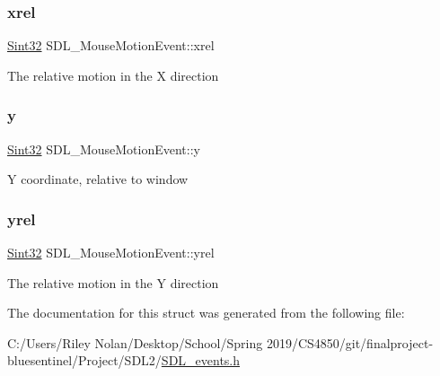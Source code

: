 \subsubsection{\texorpdfstring{xrel}{xrel}}
{\footnotesize\ttfamily \mbox{\hyperlink{_s_d_l__stdinc_8h_a7a90b941db9d4582e9ad7abb9940ff7e}{Sint32}} S\+D\+L\+\_\+\+Mouse\+Motion\+Event\+::xrel}

The relative motion in the X direction \mbox{\label{struct_s_d_l___mouse_motion_event_a7e6a7b1f8713d1968dc913908e8ea448}} 
\subsubsection{\texorpdfstring{y}{y}}
{\footnotesize\ttfamily \mbox{\hyperlink{_s_d_l__stdinc_8h_a7a90b941db9d4582e9ad7abb9940ff7e}{Sint32}} S\+D\+L\+\_\+\+Mouse\+Motion\+Event\+::y}

Y coordinate, relative to window \mbox{\label{struct_s_d_l___mouse_motion_event_a7674c8b92d039ab948f671a180fa7b30}} 
\subsubsection{\texorpdfstring{yrel}{yrel}}
{\footnotesize\ttfamily \mbox{\hyperlink{_s_d_l__stdinc_8h_a7a90b941db9d4582e9ad7abb9940ff7e}{Sint32}} S\+D\+L\+\_\+\+Mouse\+Motion\+Event\+::yrel}

The relative motion in the Y direction 

The documentation for this struct was generated from the following file\+:\begin{DoxyCompactItemize}
\item 
C\+:/\+Users/\+Riley Nolan/\+Desktop/\+School/\+Spring 2019/\+C\+S4850/git/finalproject-\/bluesentinel/\+Project/\+S\+D\+L2/\mbox{\hyperlink{_s_d_l__events_8h}{S\+D\+L\+\_\+events.\+h}}\end{DoxyCompactItemize}
